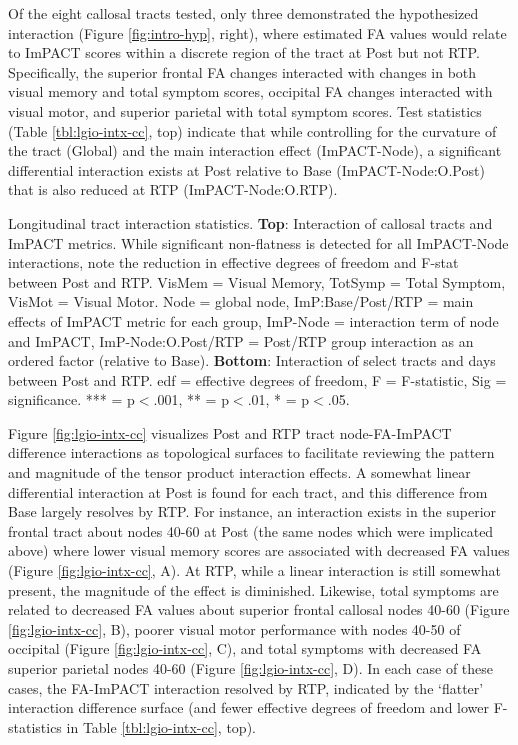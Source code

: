 \documentclass[12pt]{article}
\begin{document}
Of the eight callosal tracts tested, only three demonstrated the hypothesized interaction (Figure \ref{fig:intro-hyp}, right), where estimated FA values would relate to ImPACT scores within a discrete region of the tract at Post but not RTP. Specifically, the superior frontal FA changes interacted with changes in both visual memory and total symptom scores, occipital FA changes interacted with visual motor, and superior parietal with total symptom scores. Test statistics (Table \ref{tbl:lgio-intx-cc}, top) indicate that while controlling for the curvature of the tract (Global) and the main interaction effect (ImPACT-Node), a significant differential interaction exists at Post relative to Base (ImPACT-Node:O.Post) that is also reduced at RTP (ImPACT-Node:O.RTP).

\begin{table}[H]
	\scriptsize
	
	\caption{Longitudinal tract interaction statistics. \textbf{Top}: Interaction of callosal tracts and ImPACT metrics. While significant non-flatness is detected for all ImPACT-Node interactions, note the reduction in effective degrees of freedom and F-stat between Post and RTP. VisMem = Visual Memory, TotSymp = Total Symptom, VisMot = Visual Motor. Node = global node, ImP:Base/Post/RTP = main effects of ImPACT metric for each group, ImP-Node = interaction term of node and ImPACT, ImP-Node:O.Post/RTP = Post/RTP group interaction as an ordered factor (relative to Base). \textbf{Bottom}: Interaction of select tracts and days between Post and RTP. edf = effective degrees of freedom, F = F-statistic, Sig = significance. *** = p$<$.001, ** = p$<$.01, * = p$<$.05.}
	\label{tbl:lgio-intx-cc}
\end{table}

Figure \ref{fig:lgio-intx-cc} visualizes Post and RTP tract node-FA-ImPACT difference interactions as topological surfaces to facilitate reviewing the pattern and magnitude of the tensor product interaction effects. A somewhat linear differential interaction at Post is found for each tract, and this difference from Base largely resolves by RTP. For instance, an interaction exists in the superior frontal tract about nodes 40-60 at Post (the same nodes which were implicated above) where lower visual memory scores are associated with decreased FA values (Figure \ref{fig:lgio-intx-cc}, A). At RTP, while a linear interaction is still somewhat present, the magnitude of the effect is diminished. Likewise, total symptoms are related to decreased FA values about superior frontal callosal nodes 40-60 (Figure \ref{fig:lgio-intx-cc}, B), poorer visual motor performance with nodes 40-50 of occipital (Figure \ref{fig:lgio-intx-cc}, C), and total symptoms with decreased FA superior parietal nodes 40-60 (Figure \ref{fig:lgio-intx-cc}, D). In each case of these cases, the FA-ImPACT interaction resolved by RTP, indicated by the `flatter' interaction difference surface (and fewer effective degrees of freedom and lower F-statistics in Table \ref{tbl:lgio-intx-cc}, top).
\end{document}
